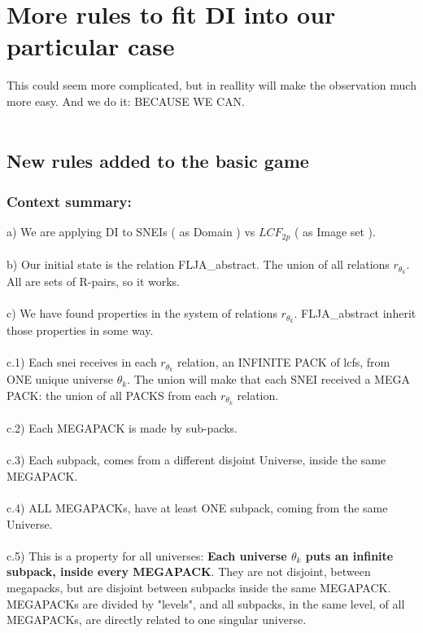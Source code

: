 \chapter{More rules to fit DI into our particular case}

	\noindent
	This could seem more complicated, but in reallity will make the observation much more easy. And we do it: BECAUSE WE CAN.
	\\\\
	
	\section{New rules added to the basic game}
		\subsection {Context summary:}
			\noindent
			a) We are applying DI to SNEIs ( as Domain ) vs $LCF_{2p}$ ( as Image set ).\\\\
			b) Our initial state is the relation FLJA\_abstract. The union of all relations $r_{\theta_{k}}$. All are sets of R-pairs, so it works.\\\\
			c) We have found properties in the system of relations $r_{\theta_{k}}$. FLJA\_abstract inherit those properties in some way.\\\\
			c.1) Each snei receives in each $r_{\theta_{k}}$ relation, an INFINITE PACK of lcfs, from ONE unique universe $\theta_{k}$. The union will make that each SNEI received a MEGA PACK: the union of all PACKS from each $r_{\theta_{k}}$ relation.\\\\
			c.2) Each MEGAPACK is made by sub-packs.\\\\
			c.3) Each subpack, comes from a different disjoint Universe, inside the same MEGAPACK.\\\\
			c.4) ALL MEGAPACKs, have at least ONE subpack, coming from the same Universe.\\\\
			c.5) This is a property for all universes: \textbf{Each universe $\theta_{k}$ puts an infinite subpack, inside every MEGAPACK}. They are not disjoint, between megapacks, but are disjoint between subpacks inside the same MEGAPACK. MEGAPACKs are divided by "levels", and all subpacks, in the same level, of all MEGAPACKs, are directly related to one singular universe.

